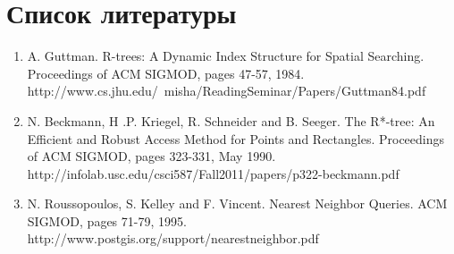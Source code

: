 \documentclass{article}
\begin{document}
    \section{Список литературы}
    \begin{enumerate}
        \item A. Guttman. R-trees: A Dynamic Index Structure for Spatial Searching. Proceedings of ACM SIGMOD, pages 47-57, 1984. http://www.cs.jhu.edu/~misha/ReadingSeminar/Papers/Guttman84.pdf

        \item N. Beckmann, H .P. Kriegel, R. Schneider and B. Seeger. The R*-tree: An Efficient and Robust Access Method for Points and Rectangles. Proceedings of ACM SIGMOD, pages 323-331, May 1990. http://infolab.usc.edu/csci587/Fall2011/papers/p322-beckmann.pdf

        \item N. Roussopoulos, S. Kelley and F. Vincent. Nearest Neighbor Queries. ACM SIGMOD, pages 71-79, 1995. http://www.postgis.org/support/nearestneighbor.pdf
    \end{enumerate}
\end{document}
